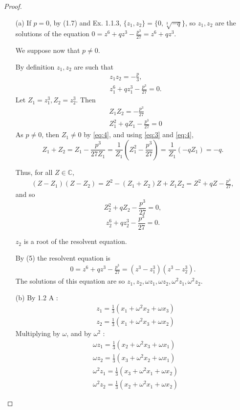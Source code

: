 \documentclass[11pt,a4paper]{article}
\begin{document}
\begin{proof}
\begin{enumerate}
\item[(a)] If $p=0$,  by (1.7) and Ex. 1.1.3, $\{z_1,z_2\} = \{0,\sqrt[3]{-q}\}$, so $z_1,z_2$ are the solutions of  the equation $ 0 = z^6+qz^3-\frac{p^3}{27} = z^6+qz^3$.

We suppose now that $p\neq 0$.

By definition $z_1, z_2$ are such that
\begin{align}
&z_1 z_2 = -\frac{p}{3}, \label{eq:1}\\
&z_1^6+qz_1^3-\frac{p^3}{27}=0.\label{eq:2}
\end{align}
Let $Z_1=z_1^3,Z_2=z_2^3$. Then
\begin{align}
&Z_1 Z_2 = -\frac{p^3}{27}\label{eq:3}\\
&Z_1^2+qZ_1-\frac{p^3}{27}=0\label{eq:4}
\end{align}
As $p\neq 0$, then $Z_1\neq 0$ by \eqref{eq:4}, and using \eqref{eq:3} and \eqref{eq:4},
$$Z_1+Z_2 = Z_1 -\frac{p^3}{27Z_1} = \frac{1}{Z_1}\left(Z_1^2 -\frac{p^3}{27}\right) = \frac{1}{Z_1}(-q Z_1) = -q.$$

Thus, for all $Z \in \mathbb{C}$,
\begin{align}
(Z-Z_1)(Z-Z_2)=Z^2-(Z_1+Z_2)Z+Z_1Z_2 = Z^2+qZ-\frac{p^3}{27}, \label{eq:5}
\end{align}
and so 
$$Z_2^2+qZ_2-\frac{p^3}{27}=0,$$
$$z_2^6+qz_2^3-\frac{p^3}{27} = 0.$$

$z_2$ is a root of the resolvent equation.

By (5) the resolvent equation is
\begin{align}
0 = z^6+qz^3-\frac{p^3}{27} = (z^3-z_1^3)(z^3-z_2^3).
\end{align}
The solutions of this equation are so $z_1,z_2,\omega z_1,\omega z_2,\omega^2 z_1,\omega^2 z_2$.


\item[(b)] By 1.2  A :
\begin{align*}
&z_1 = \frac{1}{3}(x_1+\omega^2 x_2+\omega x_3)\\
&z_2 = \frac{1}{3}(x_1+\omega^2  x_3+\omega x_2)
\end{align*}
Multiplying by $\omega$, and by $\omega^2$ : 
\begin{align*}
&\omega z_1 = \frac{1}{3}(x_2+\omega^2 x_3+\omega x_1)\\
&\omega z_2 = \frac{1}{3}(x_3+\omega^2 x_2+\omega x_1)\\
&\omega^2 z_1 = \frac{1}{3}(x_3+\omega^2 x_1+\omega x_2)\\
&\omega^2 z_2 = \frac{1}{3}(x_2+\omega^2 x_1+\omega x_2)
\end{align*}
\end{enumerate}
\end{proof}
\end{document}
